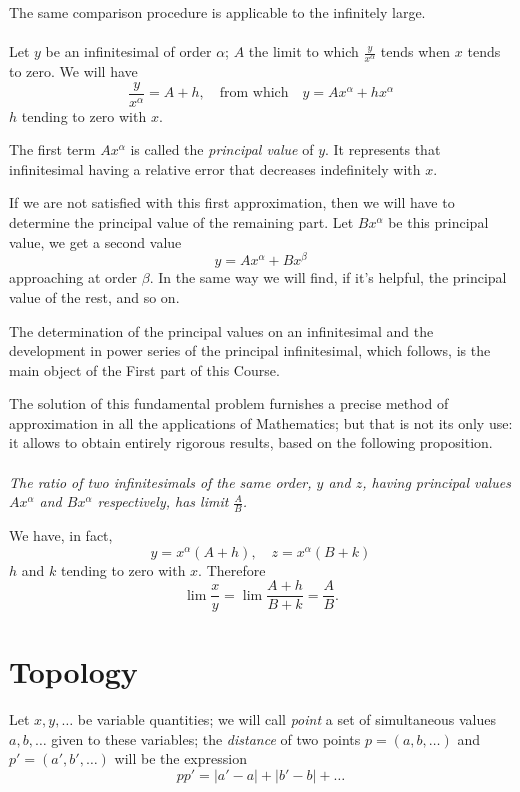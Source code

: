 \documentclass[10pt,letterpaper]{book}
\theoremstyle{definition}
\begin{document}
The same comparison procedure is applicable to the infinitely large.

\paragraph{} Let $y$ be an infinitesimal of order $\alpha$; $A$ the limit to which $\frac{y}{x^\alpha}$ tends when $x$ tends to zero. We will have
\[
  \frac{y}{x^\alpha} = A + h,
  \quad\mbox{from which}\quad
  y = Ax^\alpha + hx^\alpha
\]
$h$ tending to zero with $x$.

The first term $Ax^\alpha$ is called the \textit{principal value} of $y$. It represents that infinitesimal having a relative error that decreases indefinitely with $x$.

If we are not satisfied with this first approximation, then we will have to determine the principal value of the remaining part. Let $Bx^\alpha$ be this principal value, we get a second value
\[
  y = Ax^\alpha + B x^\beta
\]
approaching at order $\beta$. In the same way we will find, if it's helpful, the principal value of the rest, and so on.

The determination of the principal values on an infinitesimal and the development in power series of the principal infinitesimal, which follows, is the main object of the First part of this Course.


The solution of this fundamental problem furnishes a precise method of approximation in all the applications of Mathematics; but that is not its only use: it allows to obtain entirely rigorous results, based on the following proposition.

\paragraph{} \textit{The ratio of two infinitesimals of the same order, $y$ and $z$, having principal values $Ax^\alpha$ and $Bx^\alpha$ respectively, has limit $\frac A B$.}

We have, in fact,
\[
  y=x^\alpha(A+h),\quad z = x^\alpha(B + k)
\]
$h$ and $k$ tending to zero with $x$. Therefore
\[
  \lim \frac x y = \lim\frac{A+h}{B+k} = \frac A B.
\]

\section{Topology}

\paragraph{} Let $x,y,\dots$ be variable quantities; we will call \textit{point} a set of simultaneous values $a, b,\dots$ given to these variables; the \textit{distance} of two points $p=(a,b,\dots)$ and $p' = (a',b',\dots)$ will be the expression
\[
  pp' = |a'-a| + |b'-b| + \dots
\]
\end{document}
